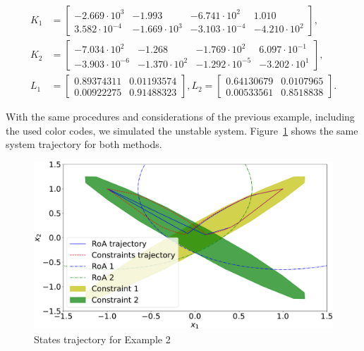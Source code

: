 \begin{align*}
	K_1 & = \begin{bmatrix}
		-2.669\cdot{}10^3   & -1.993            & -6.741\cdot{}10^2    & 1.010             \\
		3.582\cdot{}10^{-4} & -1.669\cdot{}10^3 & -3.103\cdot{}10^{-4} & -4.210\cdot{}10^2
	\end{bmatrix}, \\
	K_2 & = \begin{bmatrix}
		-7.034\cdot{}10^2    & -1.268            & -1.769\cdot{}10^2    & 6.097\cdot{}10^{-1} \\
		-3.903\cdot{}10^{-6} & -1.370\cdot{}10^2 & -1.292\cdot{}10^{-5} & -3.202\cdot{}10^1
	\end{bmatrix}, \\
	L_1 & = \begin{bmatrix}
		0.89374311 & 0.01193574 \\
		0.00922275 & 0.91488323
	\end{bmatrix},
	L_2 = \begin{bmatrix}
		0.64130679 & 0.0107965 \\
		0.00533561 & 0.8518838
	\end{bmatrix}.
\end{align*}
\normalsize

With the same procedures and considerations of the previous example, including
the used color codes, we simulated the unstable system.
Figure~\ref{fig:unstable-states} shows the same system trajectory for both
methods.

\begin{figure}[ht!]
	\centering
	\captionsetup{justification=centering}
	\includegraphics[width=\linewidth]{imgs/unstable_states}
	\caption{States trajectory for Example 2}%
	\label{fig:unstable-states}
\end{figure}

